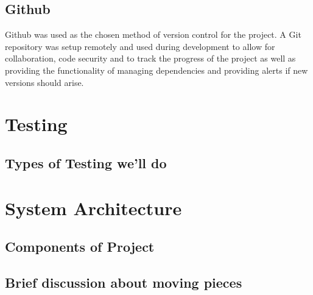 \subsection{Github}

Github was used as the chosen method of version control for the project. A Git repository was setup remotely and used during development to allow for collaboration, code security and to track the progress of the project as well as providing the functionality of managing dependencies and providing alerts if new versions should arise. 




\section{Testing}
\subsection{Types of Testing we'll do}

\section{System Architecture}
\subsection{Components of Project}
\subsection{Brief discussion about moving pieces}


